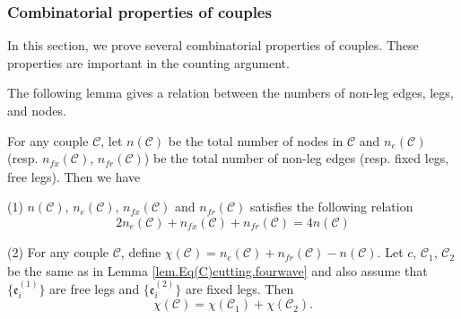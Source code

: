 \subsubsection{Combinatorial properties of couples} In this section, we prove several combinatorial properties of couples. These properties are important in the counting argument.

The following lemma gives a relation between the numbers of non-leg edges, legs, and nodes.

\begin{lem}\label{lem.eulerchar.fourwave}
For any couple $\mathcal{C}$, let $n(\mathcal{C})$ be the total number of nodes in $\mathcal{C}$ and $n_e(\mathcal{C})$ (resp. $n_{fx}(\mathcal{C})$, $n_{\textit{fr}}(\mathcal{C})$) be the total number of non-leg edges (resp. fixed legs, free legs). Then we have

(1) $n(\mathcal{C})$, $n_e(\mathcal{C})$, $n_{fx}(\mathcal{C})$ and $n_{\textit{fr}}(\mathcal{C})$ satisfies the following relation
\begin{equation}\label{eq.nnenlnle.fourwave}
 2n_e(\mathcal{C})+n_{fx}(\mathcal{C})+n_{\textit{fr}}(\mathcal{C})=4n(\mathcal{C})
\end{equation}

(2) For any couple $\mathcal{C}$, define $\chi(\mathcal{C})=n_e(\mathcal{C})+n_{\textit{fr}}(\mathcal{C})-n(\mathcal{C})$. Let $c$, $\mathcal{C}_1$, $\mathcal{C}_2$ be the same as in Lemma \ref{lem.Eq(C)cutting.fourwave} and also assume that $\{\mathfrak{e}_{i}^{(1)}\}$ are free legs and $\{\mathfrak{e}_{i}^{(2)}\}$ are fixed legs. Then 
\begin{equation}
 \chi(\mathcal{C})=\chi(\mathcal{C}_1)+\chi(\mathcal{C}_2).
\end{equation}

\end{lem}

